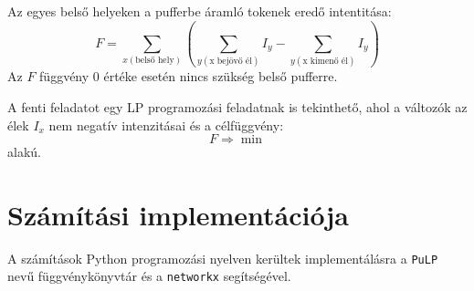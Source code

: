 Az egyes belső helyeken a pufferbe áramló tokenek  eredő intentitása:
$$F= \sum_{x(\text{belső hely})} \left( \sum_{y(\text{x bejövő él})} I_y - \sum_{y(\text{x kimenő él})} I_y \right)$$
Az $F$ függvény 0 értéke esetén nincs szükség belső pufferre.

A fenti feladatot egy LP programozási feladatnak is tekinthető, ahol a változók az élek $I_x$ nem negatív intenzitásai és a célfüggvény:
$$F\Rightarrow \min$$ alakú.

\section{Számítási implementációja}

A számítások Python programozási nyelven kerültek implementálásra a \texttt{PuLP} nevű függvénykönyvtár és a \texttt{networkx} segítségével.


